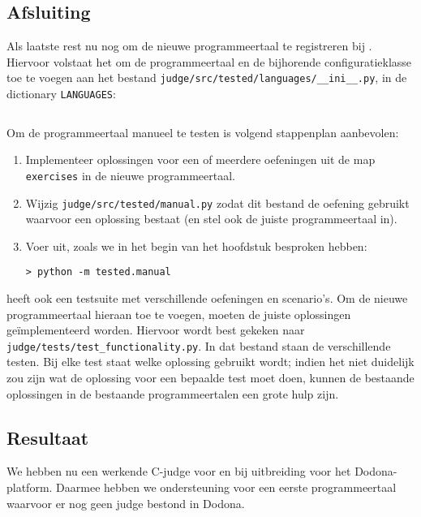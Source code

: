 \subsection{Afsluiting}\label{subsec:afsluiting}

Als laatste rest nu nog om de nieuwe programmeertaal te registreren bij \tested{}.
Hiervoor volstaat het om de programmeertaal en de bijhorende configuratieklasse toe te voegen aan het bestand \texttt{judge/src/tested/languages/\_\_ini\_\_.py}, in de dictionary \texttt{LANGUAGES}:

\inputminted[firstline=18,lastline=25]{python}{sources/languages-init.py}

Om de programmeertaal manueel te testen is volgend stappenplan aanbevolen:

\begin{enumerate}
    \item Implementeer oplossingen voor een of meerdere oefeningen uit de map \texttt{exercises} in de nieuwe programmeertaal.
    \item Wijzig \texttt{judge/src/tested/manual.py} zodat dit bestand de oefening gebruikt waarvoor een oplossing bestaat (en stel ook de juiste programmeertaal in).
    \item Voer uit, zoals we in het begin van het hoofdstuk besproken hebben:
    
    \begin{verbatim}
> python -m tested.manual
    \end{verbatim}
\end{enumerate}

\tested{} heeft ook een testsuite met verschillende oefeningen en scenario's.
Om de nieuwe programmeertaal hieraan toe te voegen, moeten de juiste oplossingen geïmplementeerd worden.
Hiervoor wordt best gekeken naar \texttt{judge/tests/test\_functionality.py}.
In dat bestand staan de verschillende testen.
Bij elke test staat welke oplossing gebruikt wordt;
indien het niet duidelijk zou zijn wat de oplossing voor een bepaalde test moet doen, kunnen de bestaande oplossingen in de bestaande programmeertalen een grote hulp zijn.

\subsection{Resultaat}\label{subsec:resultaat}

We hebben nu een werkende C-judge voor \tested{} en bij uitbreiding voor het Dodona-platform.
Daarmee hebben we ondersteuning voor een eerste programmeertaal waarvoor er nog geen judge bestond in Dodona.

